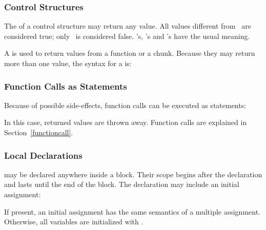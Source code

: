 \subsubsection{Control Structures}
The  of a control structure may return any value.
All values different from \nil\ are considered true;
only \nil\ is considered false.
's, 's and 's have the usual meaning.

\begin{Produc}
\end{Produc}

A  is used to return values from a function or a chunk.
\label{return}
Because they may return more than one value,
the syntax for a  is:
\begin{Produc}
\end{Produc}

\subsubsection{Function Calls as Statements} \label{funcstat}
Because of possible side-effects,
function calls can be executed as statements:
\begin{Produc}
\end{Produc}%
In this case, returned values are thrown away.
Function calls are explained in Section~\ref{functioncall}.

\subsubsection{Local Declarations} \label{localvar}
 may be declared anywhere inside a block.
Their scope begins after the declaration and lasts until the
end of the block.
The declaration may include an initial assignment:
\begin{Produc}
\end{Produc}%
If present, an initial assignment has the same semantics
of a multiple assignment.
Otherwise, all variables are initialized with \nil.


